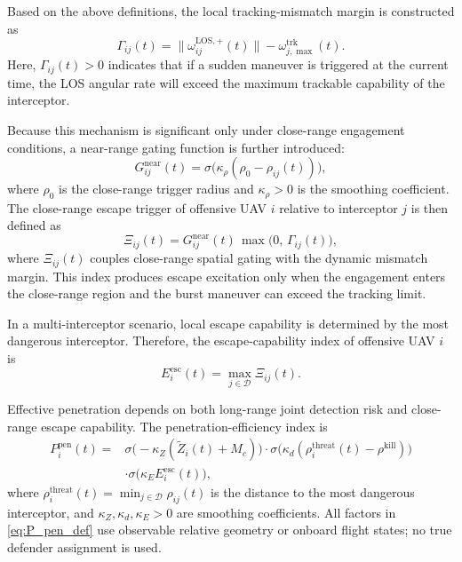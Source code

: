 \documentclass{cja}
\begin{document}
Based on the above definitions, the local tracking-mismatch margin is constructed as
\begin{equation}
\Gamma_{ij}(t)
=
\|\omega_{ij}^{\mathrm{LOS},+}(t)\|
-
\omega_{j,\max}^{\mathrm{trk}}(t).
\end{equation}
Here, $\Gamma_{ij}(t)>0$ indicates that if a sudden maneuver is triggered at the current time, the LOS angular rate will exceed the maximum trackable capability of the interceptor.

Because this mechanism is significant only under close-range engagement conditions, a near-range gating function is further introduced:
\begin{equation}
G_{ij}^{\mathrm{near}}(t)
=
\sigma\!\bigl(\kappa_{\rho}(\rho_0-\rho_{ij}(t))\bigr),
\end{equation}
where $\rho_0$ is the close-range trigger radius and $\kappa_{\rho}>0$ is the smoothing coefficient. The close-range escape trigger of offensive UAV $i$ relative to interceptor $j$ is then defined as
\begin{equation}
\Xi_{ij}(t)
=
G_{ij}^{\mathrm{near}}(t)\,\max\bigl(0,\, \Gamma_{ij}(t)\bigr),
\end{equation}
where $\Xi_{ij}(t)$ couples close-range spatial gating with the dynamic mismatch margin. This index produces escape excitation only when the engagement enters the close-range region and the burst maneuver can exceed the tracking limit.

In a multi-interceptor scenario, local escape capability is determined by the most dangerous interceptor. Therefore, the escape-capability index of offensive UAV $i$ is
\begin{equation}
E_i^{\mathrm{esc}}(t)
=
\max_{j\in\mathcal{D}} \Xi_{ij}(t).
\end{equation}

Effective penetration depends on both long-range joint detection risk and close-range escape capability. The penetration-efficiency index is
\begin{equation}
\begin{aligned}
P_i^{\mathrm{pen}}(t)
={}&
\sigma\!\bigl(-\kappa_Z(\widetilde Z_i(t)+M_c)\bigr)
\cdot
\sigma\!\bigl(\kappa_d(\rho_i^{\mathrm{threat}}(t)-\rho^{\mathrm{kill}})\bigr)\\
&\cdot
\sigma\!\bigl(\kappa_E E_i^{\mathrm{esc}}(t)\bigr),
\end{aligned}
\label{eq:P_pen_def}
\end{equation}
where $\rho_i^{\mathrm{threat}}(t)=\min_{j\in\mathcal{D}}\rho_{ij}(t)$ is the distance to the most dangerous interceptor, and $\kappa_Z,\kappa_d,\kappa_E>0$ are smoothing coefficients. All factors in \eqref{eq:P_pen_def} use observable relative geometry or onboard flight states; no true defender assignment is used.
\end{document}
